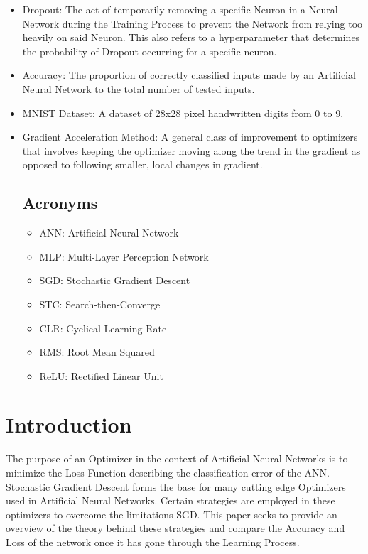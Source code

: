 \documentclass{article}
\begin{document}
\begin{itemize}
	\item Dropout: The act of temporarily removing a specific Neuron in a Neural Network during the Training Process to prevent the Network from relying too heavily on said Neuron. This also refers to a hyperparameter that determines the probability of Dropout occurring for a specific neuron. 
	\item Accuracy: The proportion of correctly classified inputs made by an Artificial Neural Network to the total number of tested inputs.
	\item MNIST Dataset: A dataset of 28x28 pixel handwritten digits from 0 to 9.
	\item Gradient Acceleration Method: A general class of improvement to optimizers that involves keeping the optimizer moving along the trend in the gradient as opposed to following smaller, local changes in gradient.
\subsection{Acronyms}
\begin{itemize}
	\item ANN: Artificial Neural Network
	\item MLP: Multi-Layer Perception Network
	\item SGD: Stochastic Gradient Descent
	\item STC: Search-then-Converge
	\item CLR: Cyclical Learning Rate
	\item RMS: Root Mean Squared
	\item ReLU: Rectified Linear Unit
\end{itemize}
	
\end{itemize}

\section{Introduction}

	The purpose of an Optimizer in the context of Artificial Neural Networks is to minimize the Loss Function describing the classification error of the ANN. 
	Stochastic Gradient Descent forms the base for many cutting edge Optimizers used in Artificial Neural Networks. Certain strategies are employed in these optimizers to overcome the limitations SGD. This paper seeks to provide an overview of the theory behind these strategies and compare the Accuracy and Loss of the network once it has gone through the Learning Process.   
\end{document}
